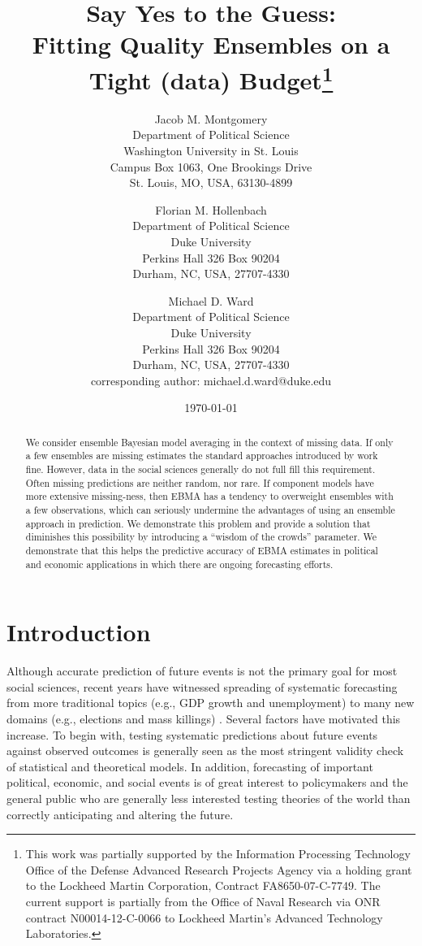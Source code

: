 \documentclass[12pt,fullpage,endnotes]{article}
\title{Say Yes to the Guess: \\ Fitting Quality Ensembles on a Tight
  (data) Budget\thanks{This work was partially supported by the Information Processing Technology Office of the Defense Advanced Research Projects Agency via a holding grant to the Lockheed Martin Corporation, Contract FA8650-07-C-7749. The current support is partially from the Office of Naval Research via ONR contract N00014-12-C-0066 to Lockheed Martin's Advanced Technology Laboratories.
    }}
\author{
Jacob M. Montgomery\\
	Department of Political Science\\
	Washington University in St. Louis\\
	Campus Box 1063, One Brookings Drive\\
	St. Louis, MO, USA, 63130-4899 
	\and
Florian M. Hollenbach  \\
	Department of Political Science\\
	Duke University\\
	Perkins Hall 326 Box 90204\\
	Durham, NC, USA, 27707-4330
	\and
Michael D. Ward\\
	Department of Political Science\\
	Duke University\\
	Perkins Hall 326 Box 90204\\
	Durham, NC, USA, 27707-4330\\
	corresponding author: michael.d.ward@duke.edu
}
\date{\today}
\begin{document}
\maketitle
\thispagestyle{empty}
\clearpage
\pagestyle{myheadings}
\newpage

\thispagestyle{empty}


\begin{abstract}
We consider ensemble Bayesian model averaging in the context of missing data.  If only
a few ensembles are missing  estimates the standard approaches introduced by \cite{Raftery:2005} work fine. However, data in the social sciences generally do not full fill this requirement. Often missing predictions are neither random, nor rare. If component models have more extensive missing-ness, then EBMA has a tendency to overweight ensembles with a few observations, which can seriously undermine the advantages of using an ensemble approach in prediction.  We demonstrate this problem and provide a solution that diminishes this possibility by introducing a ``wisdom of the crowds'' parameter. We demonstrate that this helps the predictive accuracy of EBMA estimates in political and economic applications in which there are ongoing forecasting efforts.
\end{abstract}

\doublespacing


\setcounter{page}{1}

\section{Introduction}

Although accurate prediction of future events is not the primary goal
for most social sciences, recent years have witnessed spreading of
systematic forecasting from more traditional topics (e.g., GDP growth
and unemployment) to many new domains (e.g., elections and mass
killings) .  Several factors have motivated this increase.  To begin
with, testing systematic predictions about future events against
observed outcomes is generally seen as the most stringent validity
check of statistical and theoretical models.  In addition, forecasting
of important political, economic, and social events is of great
interest to policymakers and the general public who are generally less
interested testing theories of the world than correctly anticipating
and altering the future.
\end{document}
